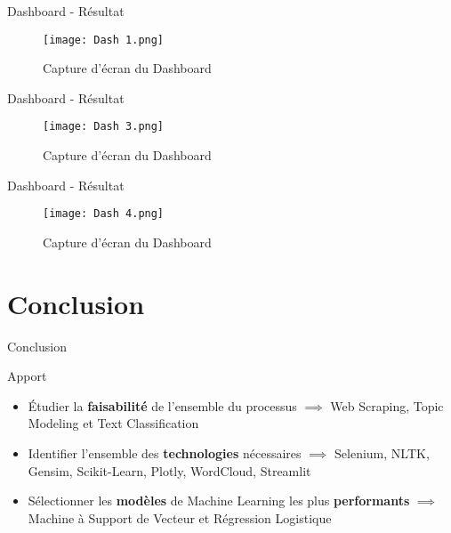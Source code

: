 \documentclass[10pt,sans,usenames,dvipsnames,english,compress]{beamer}
\begin{document}
\begin{frame}{Dashboard - Résultat}
    \begin{figure}[!h]
    \centering
    \texttt{[image: Dash 1.png]}
    \caption{Capture d'écran du Dashboard}
    \end{figure}
\end{frame}

\begin{frame}{Dashboard - Résultat}
    \begin{figure}[!h]
    \centering
    \texttt{[image: Dash 3.png]}
    \caption{Capture d'écran du Dashboard}
    \end{figure}
\end{frame}

\begin{frame}{Dashboard - Résultat}
    \begin{figure}[!h]
    \centering
    \texttt{[image: Dash 4.png]}
    \caption{Capture d'écran du Dashboard}
    \end{figure}
\end{frame}

\section{Conclusion}
\begin{frame}{Conclusion}
	\begin{exampleblock}{Apport}
		\begin{itemize}
		\item Étudier la \textbf{faisabilité} de l’ensemble du processus \newline
  $\implies$ Web Scraping, Topic Modeling et Text Classification
		\item Identifier l’ensemble des \textbf{technologies} nécessaires \newline
  $\implies$ Selenium, NLTK, Gensim, Scikit-Learn, Plotly, WordCloud, Streamlit
		\item Sélectionner les \textbf{modèles} de Machine Learning les plus \textbf{performants} \newline
  $\implies$ Machine à Support de Vecteur et Régression Logistique
		\end{itemize}
	\end{exampleblock}
\end{frame}
\end{document}
